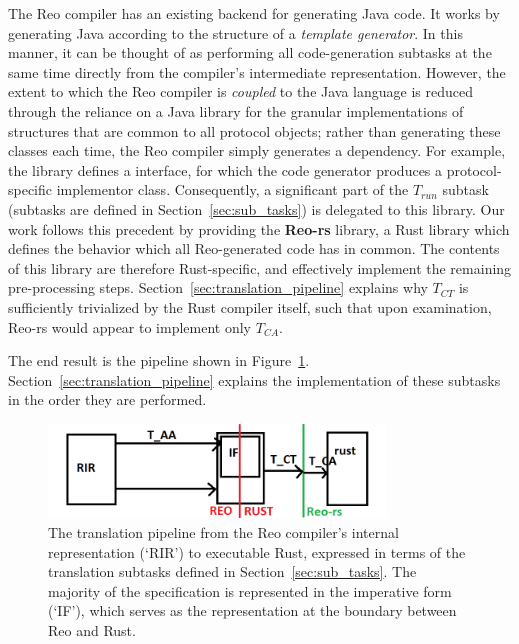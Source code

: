 The Reo compiler has an existing backend for generating Java code. It works by generating Java according to the structure of a \textit{template generator}. In this manner, it can be thought of as performing all code-generation subtasks at the same time directly from the compiler's intermediate representation. However, the extent to which the Reo compiler is \textit{coupled} to the Java language is reduced through the reliance on a Java library for the granular implementations of structures that are common to all protocol objects; rather than generating these classes each time, the Reo compiler simply generates a dependency. For example, the library defines a  interface, for which the code generator produces a protocol-specific implementor class. Consequently, a significant part of the $T_{run}$ subtask (subtasks are defined in Section~\ref{sec:sub_tasks}) is delegated to this library. Our work follows this precedent by providing the \textbf{Reo-rs} library, a Rust library which defines the behavior which all Reo-generated code has in common. The contents of this library are therefore Rust-specific, and effectively implement the remaining pre-processing steps. Section~\ref{sec:translation_pipeline} explains why $T_{CT}$ is sufficiently trivialized by the Rust compiler itself, such that upon examination, Reo-rs would appear to implement only $T_{CA}$. 

The end result is the pipeline shown in Figure~\ref{fig:pipeline}. Section~\ref{sec:translation_pipeline} explains the implementation of these subtasks in the order they are performed. 



\begin{figure}
	\centering
	\includegraphics[width=0.80\textwidth]{pipeline.png}
	\caption[TODO.]{The translation pipeline from the Reo compiler's internal representation (`RIR') to executable Rust, expressed in terms of the translation subtasks defined in Section~\ref{sec:sub_tasks}. The majority of the specification is represented in the imperative form (`IF'), which serves as the representation at the boundary between Reo and Rust.}
	\label{fig:pipeline}
\end{figure}

